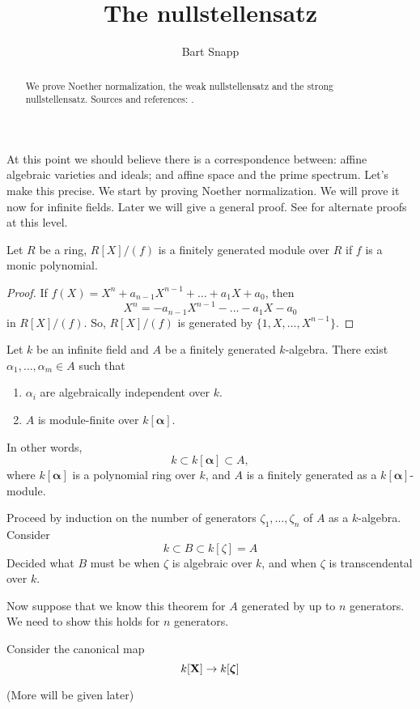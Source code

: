 \documentclass{ximera}
\author{Bart Snapp}
\title{The nullstellensatz}
\begin{document}
\begin{abstract}
  We prove Noether normalization, the weak nullstellensatz and the
  strong nullstellensatz. Sources and references:
  \cite{AM1969,dE1995,hM1986,mR1995}.
\end{abstract}
\maketitle


At this point we should believe there is a correspondence between:
affine algebraic varieties and ideals; and affine space and the prime
spectrum. Let's make this precise. We start by proving Noether
normalization. We will prove it now for infinite fields. Later we will
give a general proof. See \cite{iK1966,gK2011,eK1991} for alternate
proofs at this level.


\begin{proposition}
  Let $R$ be a ring, $R[X]/(f)$ is a finitely generated module over
  $R$ if $f$ is a monic polynomial.
  \begin{proof}
    If $f(X) = X^n + a_{n-1}X^{n-1} + \dots + a_1 X + a_0$, then
    \[
    X^n = -a_{n-1}X^{n-1} - \dots - a_1 X - a_0
    \]
    in $R[X]/(f)$. So, $R[X]/(f)$ is generated by
    $\{1,X,\dots,X^{n-1}\}$.
  \end{proof}
\end{proposition}


\begin{theorem}
  Let $k$ be an infinite field and $A$ be a finitely generated
  $k$-algebra. There exist $\alpha_1,\dots,\alpha_m\in A$ such that
  \begin{enumerate}
  \item $\alpha_i$ are algebraically independent over $k$.
  \item $A$ is module-finite over $k[\boldsymbol{\alpha}]$.
  \end{enumerate}
  In other words, 
  \[
  k\subset k[\boldsymbol{\alpha}] \subset A,
  \]
  where $k[\boldsymbol{\alpha}]$ is a polynomial ring over $k$, and
  $A$ is a finitely generated as a $k[\boldsymbol{\alpha}]$-module.
  \begin{sketch}
    Proceed by induction on the number of generators
    $\zeta_1,\dots,\zeta_n$ of $A$ as a $k$-algebra. Consider
    \[
    k \subset B \subset k[\zeta] = A
    \]
    Decided what $B$ must be when $\zeta$ is algebraic over $k$, and
    when $\zeta$ is transcendental over $k$.

    Now suppose that we know this theorem for $A$ generated by up to
    $n$ generators. We need to show this holds for $n$ generators.

    Consider the canonical map
    \[
    k[\mathbf X] \to k[\boldsymbol{\zeta}]
    \]


    (More will be given later)
  \end{sketch}
\end{theorem}
\end{document}
